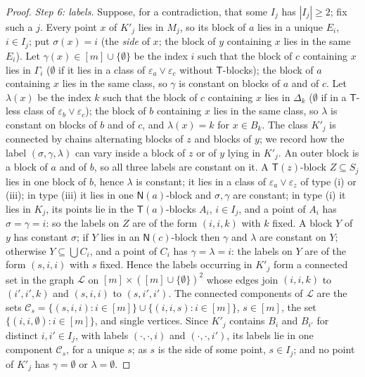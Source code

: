 \documentclass[11pt]{amsart}
\theoremstyle{definition}
\newcommand{\T}{\mathsf{T}}
\newcommand{\N}{\mathsf{N}}
\begin{document}
\begin{proof}
\smallskip\emph{Step 6: labels.} Suppose, for a contradiction, that some $I_j$ has $|I_j|\ge2$; fix such a $j$. Every point $x$ of $K'_j$ lies in $M_j$, so its block of $a$ lies in a unique $E_i$, $i\in I_j$; put $\sigma(x)=i$ (the \emph{side} of $x$; the block of $y$ containing $x$ lies in the same $E_i$). Let $\gamma(x)\in[m]\cup\{\emptyset\}$ be the index $i$ such that the block of $c$ containing $x$ lies in $\Gamma_i$ ($\emptyset$ if it lies in a class of $\varepsilon_a\vee\varepsilon_c$ without $\T$-blocks); the block of $a$ containing $x$ lies in the same class, so $\gamma$ is constant on blocks of $a$ and of $c$. Let $\lambda(x)$ be the index $k$ such that the block of $c$ containing $x$ lies in $\Delta_k$ ($\emptyset$ if in a $\T$-less class of $\varepsilon_b\vee\varepsilon_c$); the block of $b$ containing $x$ lies in the same class, so $\lambda$ is constant on blocks of $b$ and of $c$, and $\lambda(x)=k$ for $x\in B_k$. The class $K'_j$ is connected by chains alternating blocks of $z$ and blocks of $y$; we record how the label $(\sigma,\gamma,\lambda)$ can vary inside a block of $z$ or of $y$ lying in $K'_j$. An outer block is a block of $a$ and of $b$, so all three labels are constant on it. A $\T(z)$-block $Z\subseteq S_j$ lies in one block of $b$, hence $\lambda$ is constant; it lies in a class of $\varepsilon_a\vee\varepsilon_z$ of type (i) or (iii); in type (iii) it lies in one $\N(a)$-block and $\sigma,\gamma$ are constant; in type (i) it lies in $K_j$, its points lie in the $\T(a)$-blocks $A_i$, $i\in I_j$, and a point of $A_i$ has $\sigma=\gamma=i$: so the labels on $Z$ are of the form $(i,i,k)$ with $k$ fixed. A block $Y$ of $y$ has constant $\sigma$; if $Y$ lies in an $\N(c)$-block then $\gamma$ and $\lambda$ are constant on $Y$; otherwise $Y\subseteq\bigcup C_i$, and a point of $C_i$ has $\gamma=\lambda=i$: the labels on $Y$ are of the form $(s,i,i)$ with $s$ fixed. Hence the labels occurring in $K'_j$ form a connected set in the graph $\mathcal L$ on $[m]\times([m]\cup\{\emptyset\})^2$ whose edges join $(i,i,k)$ to $(i',i',k)$ and $(s,i,i)$ to $(s,i',i')$. The connected components of $\mathcal L$ are the sets $\mathcal C_s=\{(s,i,i):i\in[m]\}\cup\{(i,i,s):i\in[m]\}$, $s\in[m]$, the set $\{(i,i,\emptyset):i\in[m]\}$, and single vertices. Since $K'_j$ contains $B_i$ and $B_{i'}$ for distinct $i,i'\in I_j$, with labels $(\cdot,\cdot,i)$ and $(\cdot,\cdot,i')$, its labels lie in one component $\mathcal C_s$, for a unique $s$; as $s$ is the side of some point, $s\in I_j$; and no point of $K'_j$ has $\gamma=\emptyset$ or $\lambda=\emptyset$.


\end{proof}
\end{document}
